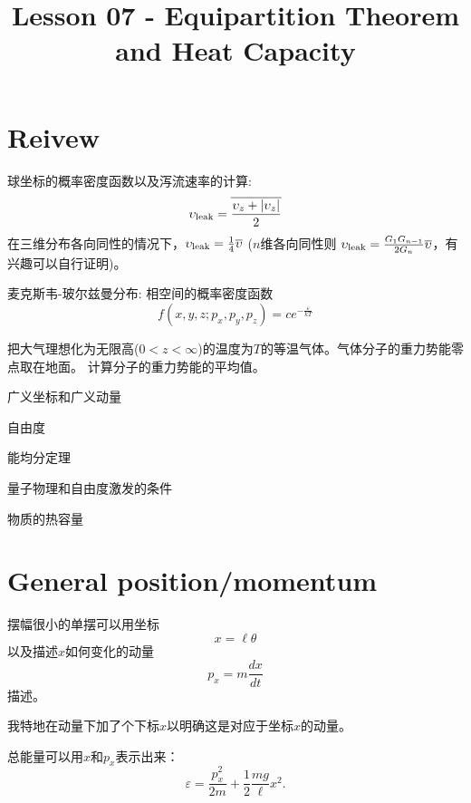 \documentclass[CJK]{beamer}
\title{Lesson 07 - Equipartition Theorem and Heat Capacity}
\author{}
\date{}
\begin{document}

\section{Reivew}

\begin{frame}
\bch
{\large
\bitem
\item{球坐标的概率密度函数以及泻流速率的计算:
  $$\upsilon_{\rm leak} = \overline{\frac{\upsilon_z+|\upsilon_z|}{2}}$$
在三维分布各向同性的情况下，$\upsilon_{\rm leak} = \frac{1}{4} \overline{\upsilon}$ ($n$维各向同性则 $\upsilon_{\rm leak} = \frac{G_1G_{n-1}}{2G_n} \overline{\upsilon}$，有兴趣可以自行证明)。
}
\item{麦克斯韦-玻尔兹曼分布: 相空间的概率密度函数
$$f(x,y,z;p_x,p_y,p_z) = c e^{-\frac{\varepsilon}{kT}}$$  }
\eitem}
\ech
\end{frame}

\begin{frame}
  \bch
      {\large
{}        
把大气理想化为无限高($0<z<\infty$)的温度为$T$的等温气体。气体分子的重力势能零点取在地面。 计算分子的重力势能的平均值。
\emini
{}
\emini}
  
  \ech
\end{frame}

\begin{frame}
\bch
\bitem
\item{广义坐标和广义动量}
\item{自由度}
\item{能均分定理}
\item{量子物理和自由度激发的条件}    
\item{物质的热容量}  
\eitem
\ech
\end{frame}


\section{General position/momentum}


\begin{frame}
\bch
{}
\emini
{}
      {\large
        摆幅很小的单摆可以用坐标
        $$x = \ell \theta$$
        以及描述$x$如何变化的动量
        $$p_x = m \frac{dx}{dt}$$
        描述。
        
     我特地在动量下加了个下标$x$以明确这是对应于坐标$x$的动量。
      }
      \emini
      

      
{\large 总能量可以用$x$和$p_x$表示出来：
$$ \varepsilon = \frac{p_x^2}{2m} + \frac{1}{2}\frac{mg}{\ell} x^2 . $$
}
      
\ech
\end{frame}
\end{document}

